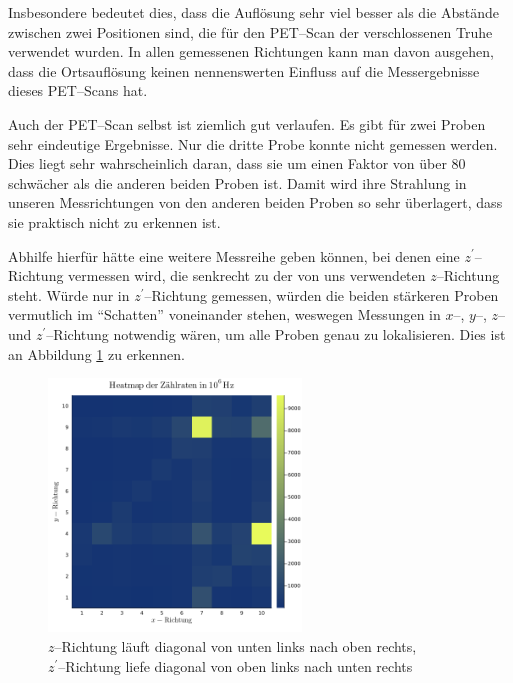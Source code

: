 \documentclass[12pt,a4paper]{scrartcl}
\numberwithin{equation}{section} %
\begin{document}
Insbesondere bedeutet dies, dass die Auflösung sehr viel besser als die Abstände zwischen zwei Positionen sind, die für den PET--Scan der verschlossenen Truhe verwendet wurden. In allen gemessenen Richtungen kann man davon ausgehen, dass die Ortsauflösung keinen nennenswerten Einfluss auf die Messergebnisse dieses PET--Scans hat.

Auch der PET--Scan selbst ist ziemlich gut verlaufen. Es gibt für zwei Proben sehr eindeutige Ergebnisse. Nur die dritte Probe konnte nicht gemessen werden. Dies liegt sehr wahrscheinlich daran, dass sie um einen Faktor von über $80$ schwächer als die anderen beiden Proben ist. Damit wird ihre Strahlung in unseren Messrichtungen von den anderen beiden Proben so sehr überlagert, dass sie praktisch nicht zu erkennen ist.

Abhilfe hierfür hätte eine weitere Messreihe geben können, bei denen eine $z^\prime$--Richtung vermessen wird, die senkrecht zu der von uns verwendeten $z$--Richtung steht. Würde nur in $z^\prime$--Richtung gemessen, würden die beiden stärkeren Proben vermutlich im ``Schatten'' voneinander stehen, weswegen Messungen in $x$--, $y$--, $z$-- und $z^\prime$--Richtung notwendig wären, um alle Proben genau zu lokalisieren. Dies ist an Abbildung \ref{abb:heatmap} zu erkennen.

\begin{figure}[h]
	\centering
	\vspace{24pt}
	\includegraphics[width=0.6\textwidth]{../media/B3.4/heatmap.png}
	\caption{$z$--Richtung läuft diagonal von unten links nach oben rechts, \\
		$z^\prime$--Richtung liefe diagonal von oben links nach unten rechts}
	\label{abb:heatmap}
\end{figure}
\end{document}
